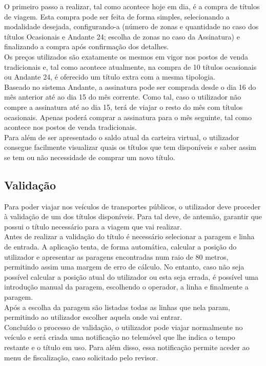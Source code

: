 O primeiro passo a realizar, tal como acontece hoje em dia, é a compra de títulos de viagem. Esta compra pode ser feita de forma simples, selecionando a modalidade desejada, configurando-a (número de zonas e quantidade no caso dos títulos Ocasionais e Andante 24; escolha de zonas no caso da Assinatura) e finalizando a compra após confirmação dos detalhes.
\\Os preços utilizados são exatamente os mesmos em vigor nos postos de venda tradicionais e, tal como acontece atualmente, na compra de 10 títulos ocasionais ou Andante 24, é oferecido um título extra com a mesma tipologia.
\\Baseado no sistema Andante, a assinatura pode ser comprada desde o dia 16 do mês anterior até ao dia 15 do mês corrente. Como tal, caso o utilizador não compre a assinatura até ao dia 15, terá de viajar o resto do mês com títulos ocasionais. Apenas poderá comprar a assinatura para o mês seguinte, tal como acontece nos postos de venda tradicionais.
\\Para além de ser apresentado o saldo atual da carteira virtual, o utilizador consegue facilmente visualizar quais os títulos que tem disponíveis e saber assim se tem ou não necessidade de comprar um novo título.

\subsection{Validação}

Para poder viajar nos veículos de transportes públicos, o utilizador deve proceder à validação de um dos títulos disponíveis. Para tal deve, de antemão, garantir que possui o título necessário para a viagem que vai realizar.
\\Antes de realizar a validação do título é necessário selecionar a paragem e linha de entrada. A aplicação tenta, de forma automática, calcular a posição do utilizador e apresentar as paragens encontradas num raio de 80 metros, permitindo assim uma margem de erro de cálculo. No entanto, caso não seja possível calcular a posição atual do utilizador ou esta seja errada, é possível uma introdução manual da paragem, escolhendo o operador, a linha e finalmente a paragem.
\\Após a escolha da paragem são listadas todas as linhas que nela param, permitindo ao utilizador escolher aquela onde vai entrar.
\\Concluído o processo de validação, o utilizador pode viajar normalmente no veículo e será criada uma notificação no telemóvel que lhe indica o tempo restante e o título em uso. Para além disso, essa notificação permite aceder ao menu de fiscalização, caso solicitado pelo revisor.

